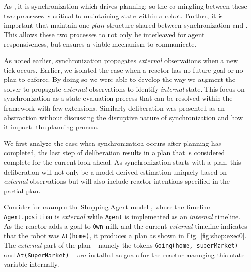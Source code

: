 As , it is
synchronization which drives planning; so the co-mingling between
these two processes is critical to maintaining state within a robot.
Further, it is important that \rx maintain one $plan$ structure shared
between synchronization and . This allows these
two processes to not only be interleaved for agent responsiveness, but
ensures a viable mechanism to communicate.

As  noted earlier, synchronization propagates {\em
  external} observations when a new tick occurs. Earlier, we isolated
the case when a reactor has no future goal or no plan to enforce. By
doing so we were able to develop the way we augment the \eu solver to
propagate {\em external} observations to identify {\em internal}
state. This  focus on synchronization as a state
evaluation process that can be resolved within the \eu framework with
few extensions. Similarly deliberation was presented as an abstraction
without discussing the disruptive nature of synchronization and how it
impacts the planning process. 

We first analyze the case when synchronization occurs after planning
has completed, \ie the last step of deliberation results in a plan
that is considered complete for the current look-ahead. As
synchronization starts with a plan, this deliberation will not only be
a model-derived estimation uniquely based on {\em external}
observations but will also include reactor intentions specified in the
partial plan.

Consider for example the Shopping Agent model , where the timeline
\texttt{Agent.position} is {\em external} while \texttt{Agent} is
implemented as an {\em internal} timeline. As the reactor adds a goal
to \texttt{Own} milk and the current {\em external} timeline indicates
that the robot was \texttt{At(home)}, it produces a plan as shown in
Fig. \ref{fig:shop:exec0}. The {\em external} part of the plan --
namely the tokens \texttt{Going(home, superMarket)} and
\texttt{At(SuperMarket)} -- are installed as goals for the reactor
managing this state variable internally.


